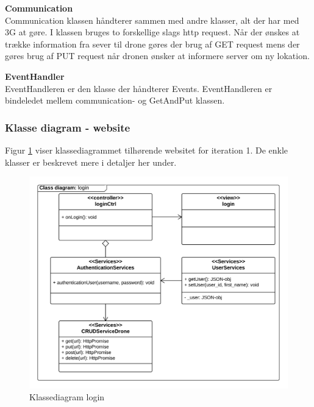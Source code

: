 \textbf{Communication} \\
Communication klassen håndterer sammen med andre klasser, alt der har med 3G at gøre. 
I klassen bruges to forskellige slags http request. Når der ønskes at trække information fra sever til drone gøres der brug af GET request mens der gøres brug af PUT request når dronen ønsker at informere server om ny lokation.

\textbf{EventHandler} \\
EventHandleren er den klasse der håndterer Events. EventHandleren er bindeledet mellem communication- og GetAndPut klassen. 





\newpage

\subsubsection*{Klasse diagram - website}
\vspace{-0.1cm}
Figur \ref{fig:classDiagram_login} viser klassediagrammet tilhørende websitet for iteration 1. De enkle klasser er beskrevet mere i detaljer her under.
\begin{figure}[H]
	\centering
	\includegraphics[width=1\textwidth]{Billeder/klasse_diagrammer/login_class_diagram.png}
	\vspace{-0.5cm}
	\caption{Klassediagram login}
	\label{fig:classDiagram_login}
\end{figure}

\newpage

